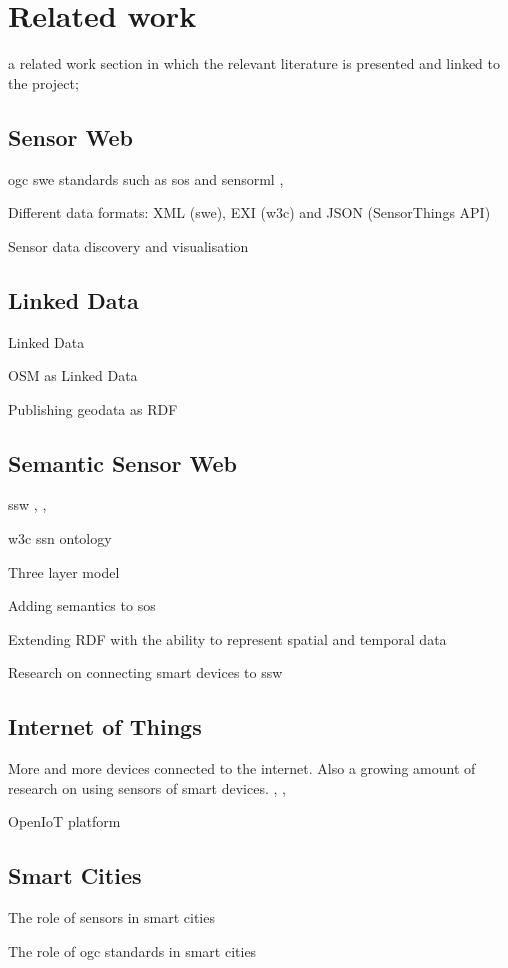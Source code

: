 \chapter{Related work}
\label{chap:rw}

a related work section in which the relevant literature is presented and linked to the project;


\section{Sensor Web}
\ac{ogc} \ac{swe} standards such as \ac{sos} and \ac{sensorml} \citep{SW:OGC}, \citep{SW:Botts}

Different data formats: XML (\ac{swe}), EXI (\ac{w3c}) and JSON (SensorThings API) \citep{IOT:Zanelli}

Sensor data discovery \citep{SW:OGC2} and visualisation \citep{SW:Yoo}


\section{Linked Data}
Linked Data \citep{LD:Berners-lee}

OSM as Linked Data \citep{LD:Auer}

Publishing geodata as RDF \citep{LD:Missier}


\section{Semantic Sensor Web}
\ac{ssw} \citep{SSW:Sheth}, \citep{SSW:deMel}, \citep{SSW:Bakillah}

\ac{w3c} \ac{ssn} ontology \citep{SSW:SSN_incubatorGroup}

Three layer model 

Adding semantics to \ac{sos} \citep{SSW:Henson}

Extending RDF with the ability to represent spatial and temporal data \citep{SSW:Koubarakis}

Research on connecting smart devices to \ac{ssw} \citep{SSW:Vera}  


\section{Internet of Things}
More and more devices connected to the internet. Also a growing amount of research on using sensors of smart devices. \citep{IOT:Waher}, \citep{SSW:Calbimonte}, \citep{IOT:Zarko}


OpenIoT platform \citep{IOT:Calbimonte}


\section{Smart Cities}
The role of sensors in smart cities \citep{IOT:Zanelli}

The role of \ac{ogc} standards in smart cities \citep{SC:OGC}
